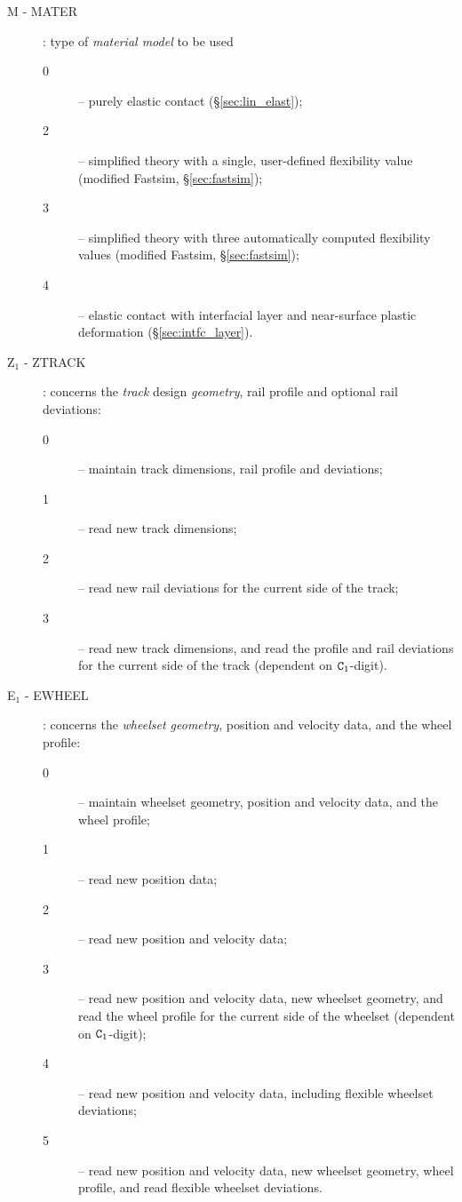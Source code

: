 \documentclass[12pt]{report}
\renewcommand{\magenta}[1]{}
\begin{document}
\begin{description}
\item[M - MATER] \label{m-digit} : type of {\em material model\/} to be used
\begin{description}
\item[0] -- purely elastic contact (\S \ref{sec:lin_elast});
\magenta{
\item[1] -- viscoelastic contact (\S \ref{sec:visc_elast});
}
\item[2] -- simplified theory with a single, user-defined flexibility value
        (modified Fastsim, \S \ref{sec:fastsim});
\item[3] -- simplified theory with three automatically computed flexibility
        values (modified Fastsim, \S \ref{sec:fastsim});
\item[4] -- elastic contact with interfacial layer and near-surface plastic
        deformation (\S \ref{sec:intfc_layer}).
\magenta{
\item[5] -- reserved for pseudo-viscous damping;
\item[6] -- reserved for two quarter-spaces with vertical gap in between.
}
\end{description}

\item[Z$_1$ - ZTRACK] \label{z1-digit}: concerns the {\em track\/} design {\em
        geometry\/}, rail profile and optional rail deviations:
\begin{description}
\item[0] -- maintain track dimensions, rail profile and deviations;
\item[1] -- read new track dimensions;
\item[2] -- read new rail deviations for the current side of the track;
\item[3] -- read new track dimensions, and read the profile and rail
        deviations for the current side of the track (dependent on 
        ${\tt C}_1$-digit).
\end{description}

\item[E$_1$ - EWHEEL] \label{e1-digit} : concerns the {\em wheelset
        geometry\/}, position and velocity data, and the wheel profile:
\begin{description}
\item[0] -- maintain wheelset geometry, position and velocity data, and the
        wheel profile;
\item[1] -- read new position data;
\item[2] -- read new position and velocity data;
\item[3] -- read new position and velocity data, new wheelset geometry,
        and read the wheel profile for the current side of the wheelset
        (dependent on ${\tt C}_1$-digit);
\item[4] -- read new position and velocity data, including flexible
        wheelset deviations;
\item[5] -- read new position and velocity data, new wheelset geometry,
        wheel profile, and read flexible wheelset deviations.
\end{description}

\end{description}
\end{document}
